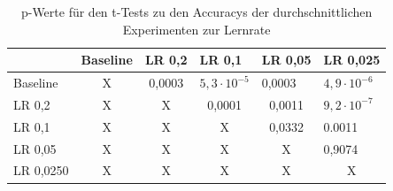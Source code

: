 \begin{table}[]
\caption{p-Werte für den t-Tests zu den Accuracys der durchschnittlichen Experimenten zur Lernrate}
\begin{tabular}{l|c|c|c|c|l|}
\cline{2-6}
                               & \multicolumn{1}{l|}{Baseline} & \multicolumn{1}{l|}{LR 0,2} & \multicolumn{1}{l|}{LR 0,1}                       & \multicolumn{1}{l|}{LR 0,05} & LR 0,025                       \\ \hline
\multicolumn{1}{|l|}{Baseline} & X                             & 0,0003                      & \multicolumn{1}{l|}{$5,3\cdot10^{-5}$} & \multicolumn{1}{l|}{0,0003}  & $4,9\cdot10^{-6}$   \\ \hline
\multicolumn{1}{|l|}{LR 0,2}   & X                             & X                           & 0,0001                                            & 0,0011                       & $9,2\cdot10^{-7}$   \\ \hline
\multicolumn{1}{|l|}{LR 0,1}   & X                             & X                           & X                                                 & 0,0332                       & 0.0011                         \\ \hline
\multicolumn{1}{|l|}{LR 0,05}  & X                             & X                           & X                                                 & X                            & \cellcolor[HTML]{FE0000}0,9074 \\ \hline
\multicolumn{1}{|l|}{LR 0,0250} & X                             & X                           & X                                                 & X                            & \multicolumn{1}{c|}{X}         \\ \hline
\end{tabular}
\label{tab:lr1}
\end{table}
 
